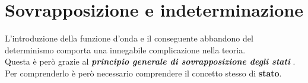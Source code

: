 \documentclass[../../../Meccanica_quantistica]{subfiles}
\begin{document}
\section{Sovrapposizione e indeterminazione}
  \label{sec:sovrapposizione-e-indeterminazione}

  L'introduzione della funzione d'onda e il conseguente
  abbandono del determinismo comporta una innegabile
  complicazione nella teoria. \\
  Questa è però  grazie al
  \textbf{
    \textit{principio generale di sovrapposizione degli stati}
  }. \\  
  Per comprenderlo è però necessario comprendere il concetto
  stesso di \textbf{stato}.

  

  

   

  
\end{document}
